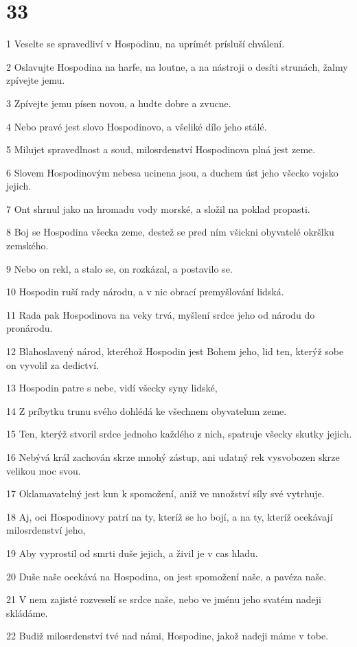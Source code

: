 \chapter{33}

\par 1 Veselte se spravedliví v Hospodinu, na uprímét prísluší chválení.
\par 2 Oslavujte Hospodina na harfe, na loutne, a na nástroji o desíti strunách, žalmy zpívejte jemu.
\par 3 Zpívejte jemu písen novou, a hudte dobre a zvucne.
\par 4 Nebo pravé jest slovo Hospodinovo, a všeliké dílo jeho stálé.
\par 5 Milujet spravedlnost a soud, milosrdenství Hospodinova plná jest zeme.
\par 6 Slovem Hospodinovým nebesa ucinena jsou, a duchem úst jeho všecko vojsko jejich.
\par 7 Ont shrnul jako na hromadu vody morské, a složil na poklad propasti.
\par 8 Boj se Hospodina všecka zeme, destež se pred ním všickni obyvatelé okršlku zemského.
\par 9 Nebo on rekl, a stalo se, on rozkázal, a postavilo se.
\par 10 Hospodin ruší rady národu, a v nic obrací premyšlování lidská.
\par 11 Rada pak Hospodinova na veky trvá, myšlení srdce jeho od národu do pronárodu.
\par 12 Blahoslavený národ, kteréhož Hospodin jest Bohem jeho, lid ten, kterýž sobe on vyvolil za dedictví.
\par 13 Hospodin patre s nebe, vidí všecky syny lidské,
\par 14 Z príbytku trunu svého dohlédá ke všechnem obyvatelum zeme.
\par 15 Ten, kterýž stvoril srdce jednoho každého z nich, spatruje všecky skutky jejich.
\par 16 Nebývá král zachován skrze mnohý zástup, ani udatný rek vysvobozen skrze velikou moc svou.
\par 17 Oklamavatelný jest kun k spomožení, aniž ve množství síly své vytrhuje.
\par 18 Aj, oci Hospodinovy patrí na ty, kteríž se ho bojí, a na ty, kteríž ocekávají milosrdenství jeho,
\par 19 Aby vyprostil od smrti duše jejich, a živil je v cas hladu.
\par 20 Duše naše ocekává na Hospodina, on jest spomožení naše, a pavéza naše.
\par 21 V nem zajisté rozveselí se srdce naše, nebo ve jménu jeho svatém nadeji skládáme.
\par 22 Budiž milosrdenství tvé nad námi, Hospodine, jakož nadeji máme v tobe.

